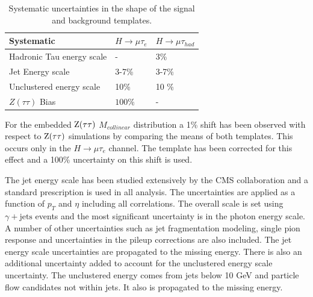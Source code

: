 \documentclass[oneside, letterpaper, oldfontcommands]{memoir}
\begin{document}
{{{\begin{table}[hbtp]
\end{table}


\begin{table}[hbtp]
 \begin{center}
  \caption{Systematic uncertainties in the shape of the signal and background templates.}
  \label{tab:shape_systematics}
  \vspace{0.1in}
  \begin{tabular}{|l|l|l|} \hline
Systematic                                             &  $H \to \mu \tau_{e}$      &   $H \to \mu \tau_{had}$                                      \\ \hline\hline
Hadronic Tau energy scale                              &   -         &    3\%                                    \\    \hline
Jet Energy scale                                       &   3-7\%     &    3-7\%                                       \\    \hline
Unclustered energy scale                                &   10\%      &    10 \%                                  \\    \hline
$Z(\tau \tau)$ Bias                                 &   $100\%$ &     -                                          \\   \hline
  \end{tabular}
 \end{center}
\end{table}



For the embedded $\mathrm{Z}(\tau \tau)$ $M_{collinear}$ distribution a 1\% shift has been
observed with respect to $\mathrm{Z}(\tau \tau)$ simulations by comparing the means
of both templates.
This occurs only in the $H \rightarrow \mu \tau_{e}$ channel.
The template has been corrected for this effect  and a 100\% uncertainty on this shift is used.

The jet energy scale has been studied extensively by the CMS collaboration and a standard
prescription is used in all analysis.
The uncertainties are applied as a function of
$p_{T}$ and $\eta$ including all correlations. The overall scale is set using
$\gamma+\mathrm{jets}$ events and the most significant uncertainty is in the photon energy scale.
A number of other uncertainties such as jet fragmentation modeling, single pion response
and uncertainties in the pileup corrections are also included. The jet energy scale
uncertainties are propagated to the missing energy.  There is also an additional uncertainty added
to account for the unclustered energy scale uncertainty. The unclustered energy comes from jets below
10 GeV and particle flow candidates not within jets. It also is propagated to the missing energy.


}}}
\end{document}
